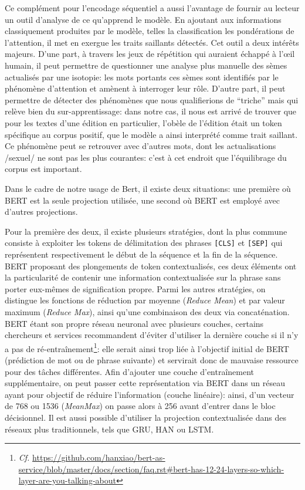 Ce complément pour l'encodage séquentiel a aussi l'avantage de fournir au lecteur un outil d'analyse de ce qu'apprend le modèle. En ajoutant aux informations classiquement produites par le modèle, telles la classification les pondérations de l'attention, il met en exergue les traits saillants détectés. Cet outil a deux intérêts majeurs. D'une part, à travers les jeux de répétition qui auraient échappé à l'œil humain, il peut permettre de questionner une analyse plus manuelle des sèmes actualisés par une isotopie: les mots portants ces sèmes sont identifiés par le phénomène d'attention et amènent à interroger leur rôle. D'autre part, il peut permettre de détecter des phénomènes que nous qualifierions de \enquote{triche} mais qui relève bien du sur-apprentissage: dans notre cas, il nous est arrivé de trouver que pour les textes d'une édition en particulier, l'obèle de l'édition était un token spécifique au corpus positif, que le modèle a ainsi interprété comme trait saillant. Ce phénomène peut se retrouver avec d'autres mots, dont les actualisations /sexuel/ ne sont pas les plus courantes: c'est à cet endroit que l'équilibrage du corpus est important.

Dans le cadre de notre usage de Bert, il existe deux situations: une première où BERT est la seule projection utilisée, une second où BERT est employé avec d'autres projections.

Pour la première des deux, il existe plusieurs stratégies, dont la plus commune consiste à exploiter les tokens de délimitation des phrases \texttt{[CLS]} et \texttt{[SEP]} qui représentent respectivement le début de la séquence et la fin de la séquence. BERT proposant des plongements de token contextualisés, ces deux éléments ont la particularité de contenir une information contextualisée sur la phrase sans porter eux-mêmes de signification propre. Parmi les autres stratégies, on distingue les fonctions de réduction par moyenne (\textit{Reduce Mean}) et par valeur maximum (\textit{Reduce Max}), ainsi qu'une combinaison des deux via concaténation. BERT étant son propre réseau neuronal avec plusieurs couches, certains chercheurs et services recommandent d'éviter d'utiliser la dernière couche si il n'y a pas de ré-entraînement\footnote{\textit{Cf.} \url{https://github.com/hanxiao/bert-as-service/blob/master/docs/section/faq.rst\#bert-has-12-24-layers-so-which-layer-are-you-talking-about}}: elle serait ainsi trop liée à l'objectif initial de BERT (prédiction de mot ou de phrase suivante) et servirait donc de mauvaise ressource pour des tâches différentes. Afin d'ajouter une couche d'entraînement supplémentaire, on peut passer cette représentation via BERT dans un réseau ayant pour objectif de réduire l'information (couche linéaire): ainsi, d'un vecteur de 768 ou 1536 (\textit{MeanMax}) on passe alors à 256 avant d'entrer dans le bloc décisionnel. Il est aussi possible d'utiliser la projection contextualisée dans des réseaux plus traditionnels, tels que GRU, HAN ou LSTM.

